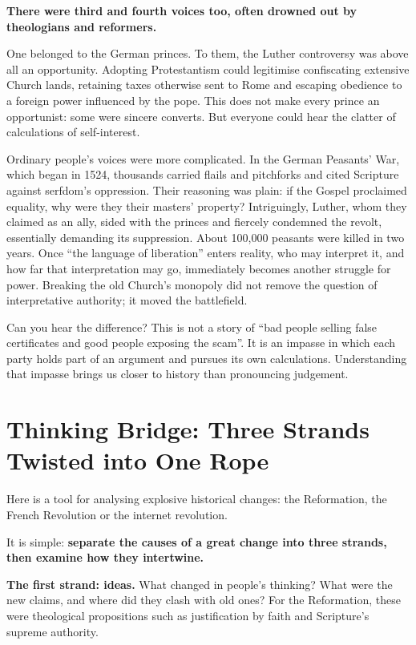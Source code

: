 \textbf{There were third and fourth voices too, often drowned out by theologians and reformers.}

One belonged to the German princes. To them, the Luther controversy was above all an opportunity. Adopting Protestantism could legitimise confiscating extensive Church lands, retaining taxes otherwise sent to Rome and escaping obedience to a foreign power influenced by the pope. This does not make every prince an opportunist: some were sincere converts. But everyone could hear the clatter of calculations of self-interest.

Ordinary people's voices were more complicated. In the German Peasants' War, which began in 1524, thousands carried flails and pitchforks and cited Scripture against serfdom's oppression. Their reasoning was plain: if the Gospel proclaimed equality, why were they their masters' property? Intriguingly, Luther, whom they claimed as an ally, sided with the princes and fiercely condemned the revolt, essentially demanding its suppression. About 100,000 peasants were killed in two years. Once ``the language of liberation'' enters reality, who may interpret it, and how far that interpretation may go, immediately becomes another struggle for power. Breaking the old Church's monopoly did not remove the question of interpretative authority; it moved the battlefield.

Can you hear the difference? This is not a story of ``bad people selling false certificates and good people exposing the scam''. It is an impasse in which each party holds part of an argument and pursues its own calculations. Understanding that impasse brings us closer to history than pronouncing judgement.

\section[Thinking Bridge: Three Strands]{Thinking Bridge: Three Strands Twisted into One Rope}
Here is a tool for analysing explosive historical changes: the Reformation, the French Revolution or the internet revolution.

It is simple: \textbf{separate the causes of a great change into three strands, then examine how they intertwine.}

\textbf{The first strand: ideas.} What changed in people's thinking? What were the new claims, and where did they clash with old ones? For the Reformation, these were theological propositions such as justification by faith and Scripture's supreme authority.


